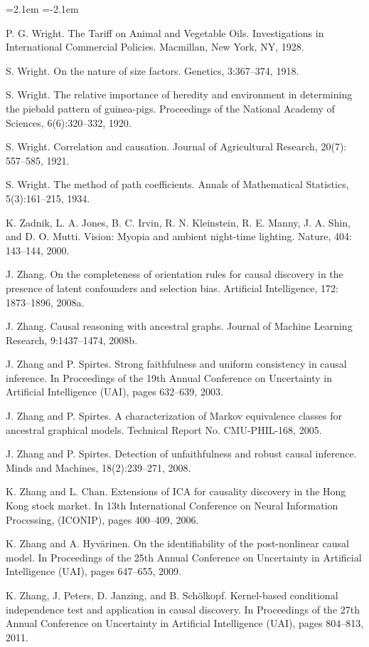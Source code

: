 \begin{list}{}{\leftmargin=2.1em
 \itemindent=-2.1em\parsep=0pt\itemsep=3pt}
\item P. G. Wright. The Tariff on Animal and Vegetable Oils. Investigations in International Commercial Policies. Macmillan, New York, NY, 1928.
\item S. Wright. On the nature of size factors. Genetics, 3:367--374, 1918.
\item S. Wright. The relative importance of heredity and environment in determining the piebald pattern of guinea-pigs. Proceedings of the National Academy of Sciences, 6(6):320--332, 1920.
\item S. Wright. Correlation and causation. Journal of Agricultural Research, 20(7): 557--585, 1921.
\item S. Wright. The method of path coefficients. Annals of Mathematical Statistics, 5(3):161--215, 1934.
\item K. Zadnik, L. A. Jones, B. C. Irvin, R. N. Kleinstein, R. E. Manny, J. A. Shin, and D. O. Mutti. Vision: Myopia and ambient night-time lighting. Nature, 404: 143--144, 2000.
\item J. Zhang. On the completeness of orientation rules for causal discovery in the presence of latent confounders and selection bias. Artificial Intelligence, 172: 1873--1896, 2008a.
\item J. Zhang. Causal reasoning with ancestral graphs. Journal of Machine Learning Research, 9:1437--1474, 2008b.
\item J. Zhang and P. Spirtes. Strong faithfulness and uniform consistency in causal inference. In Proceedings of the 19th Annual Conference on Uncertainty in Artificial Intelligence (UAI), pages 632--639, 2003.
\item J. Zhang and P. Spirtes. A characterization of Markov equivalence classes for ancestral graphical models. Technical Report No. CMU-PHIL-168, 2005.
\item J. Zhang and P. Spirtes. Detection of unfaithfulness and robust causal inference. Minds and Machines, 18(2):239--271, 2008.
\item K. Zhang and L. Chan. Extensions of ICA for causality discovery in the Hong Kong stock market. In 13th International Conference on Neural Information Processing, (ICONIP), pages 400--409, 2006.
\item K. Zhang and A. Hyvärinen. On the identifiability of the post-nonlinear causal model. In Proceedings of the 25th Annual Conference on Uncertainty in Artificial Intelligence (UAI), pages 647--655, 2009.
\item K. Zhang, J. Peters, D. Janzing, and B. Schölkopf. Kernel-based conditional independence test and application in causal discovery. In Proceedings of the 27th Annual Conference on Uncertainty in Artificial Intelligence (UAI), pages 804--813, 2011.

\end{list}

